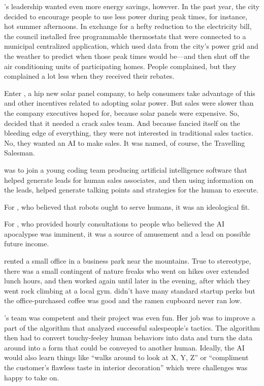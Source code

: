 \crunchyCity{}'s leadership wanted even more energy savings, however. In the past year, the city decided to encourage people to use less power during peak times, for instance, hot summer afternoons. In exchange for a hefty reduction to the electricity bill, the council installed free programmable thermostats that were connected to a municipal centralized application, which used data from the city's power grid and the weather to predict when those peak times would be---and then shut off the air conditioning units of participating homes. People complained, but they complained a lot less when they received their rebates.

Enter \energyCompany{}, a hip new solar panel company, to help consumers take advantage of this and other incentives related to adopting solar power. But sales were slower than the company executives hoped for, because solar panels were expensive. So, \energyCompany{} decided that it needed a crack sales team. And because \energyCompany{} fancied itself on the bleeding edge of everything, they were not interested in traditional sales tactics. No, they wanted an AI to make sales. It was named, of course, the Travelling Salesman.

{\protag} was to join a young coding team producing artificial intelligence software that helped generate leads for human sales associates, and then using information on the leads, helped generate talking points and strategies for the human to execute.

For {\protag}, who believed that robots ought to serve humans, it was an ideological fit.

For {\sidetag}, who provided hourly consultations to people who believed the AI apocalypse was imminent, it was a source of amusement and a lead on possible future income.

\sectionBreak{}

\energyCompany{} rented a small office in a business park near the mountains. True to \crunchyCity{} stereotype, there was a small contingent of nature freaks who went on hikes over extended lunch hours, and then worked again until later in the evening, after which they went rock climbing at a local gym. \energyCompany{} didn't have many standard startup perks but the office-purchased coffee was good and the ramen cupboard never ran low.

{\protag}'s team was competent and their project was even fun. Her job was to improve a part of the algorithm that analyzed successful salespeople's tactics. The algorithm then had to convert touchy-feeley human behaviors into data and turn the data around into a form that could be conveyed to another human. Ideally, the AI would also learn things like ``walks around to look at X, Y, Z'' or ``compliment the customer's flawless taste in interior decoration'' which were challenges {\protag} was happy to take on.

